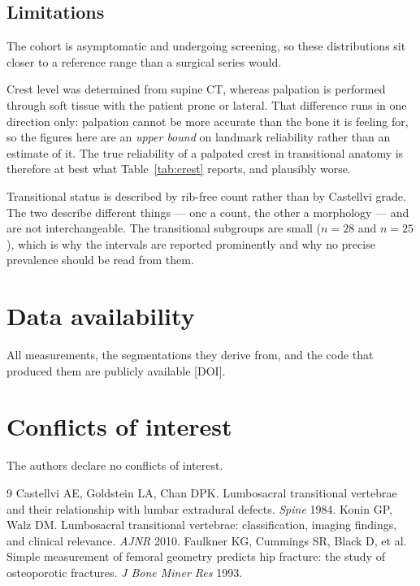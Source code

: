 \documentclass[11pt,a4paper]{article}
\begin{document}
\subsection{Limitations}

The cohort is asymptomatic and undergoing screening, so these distributions sit closer to
a reference range than a surgical series would.

Crest level was determined from supine CT, whereas palpation is performed through soft
tissue with the patient prone or lateral. That difference runs in one direction only:
palpation cannot be more accurate than the bone it is feeling for, so the figures here
are an \emph{upper bound} on landmark reliability rather than an estimate of it. The
true reliability of a palpated crest in transitional anatomy is therefore at best what
Table~\ref{tab:crest} reports, and plausibly worse.

Transitional status is described by rib-free count rather than by Castellvi grade. The
two describe different things --- one a count, the other a morphology --- and are not
interchangeable. The transitional subgroups are small ($n=28$ and $n=25$), which is why
the intervals are reported prominently and why no precise prevalence should be read from
them.

\section*{Data availability}
All measurements, the segmentations they derive from, and the code that produced them are
publicly available [DOI].

\section*{Conflicts of interest}
The authors declare no conflicts of interest.

\begin{thebibliography}{9}
 Castellvi AE, Goldstein LA, Chan DPK. Lumbosacral transitional
  vertebrae and their relationship with lumbar extradural defects. \emph{Spine} 1984.
 Konin GP, Walz DM. Lumbosacral transitional vertebrae: classification,
  imaging findings, and clinical relevance. \emph{AJNR} 2010.
 Faulkner KG, Cummings SR, Black D, et al. Simple measurement of
  femoral geometry predicts hip fracture: the study of osteoporotic fractures.
  \emph{J Bone Miner Res} 1993. %
\end{thebibliography}
\end{document}
